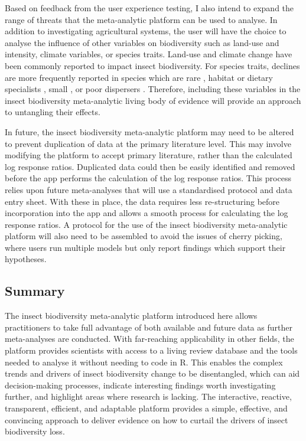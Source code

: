 \documentclass[11pt]{article}
\begin{document}
		\noindent Based on feedback from the user experience testing, I also intend to expand the range of threats that the meta-analytic platform can be used to analyse. In addition to investigating agricultural systems, the user will have the choice to analyse the influence of other variables on biodiversity such as land-use and intensity, climate variables, or species traits. Land-use \citep{newbold2016global,seibold2019arthropod,gillespie2022landscape} and climate change \citep{deutsch2008impacts,lister2018climate,engelhardt2022consistent} have been commonly reported to impact insect biodiversity. For species traits, declines are more frequently reported in species which are rare \citep{powney2019widespread,outhwaite2020complex}, habitat or dietary specialists \citep{biesmeijer2006parallel,boyes2019bucking,wagner2021window}, small \citep{homburg2019have}, or poor dispersers \citep{cardoso2020scientists}. Therefore, including these variables in the insect biodiversity meta-analytic living body of evidence will provide an approach to untangling their effects. 
		
		\noindent In future, the insect biodiversity meta-analytic platform may need to be altered to prevent duplication of data at the primary literature level. This may involve modifying the platform to accept primary literature, rather than the calculated log response ratios. Duplicated data could then be easily identified and removed before the app performs the calculation of the log response ratios. This process relies upon future meta-analyses that will use a standardised protocol and data entry sheet. With these in place, the data requires less re-structuring before incorporation into the app and allows a smooth process for calculating the log response ratios. A protocol for the use of the insect biodiversity meta-analytic platform will also need to be assembled to avoid the issues of cherry picking, where users run multiple models but only report findings which support their hypotheses. 
		
		\subsection{Summary}
		The insect biodiversity meta-analytic platform introduced here allows practitioners to take full advantage of both available and future data as further meta-analyses are conducted. With far-reaching applicability in other fields, the platform provides scientists with access to a living review database and the tools needed to analyse it without needing to code in R. This enables the complex trends and drivers of insect biodiversity change to be disentangled, which can aid decision-making processes, indicate interesting findings worth investigating further, and highlight areas where research is lacking. The interactive, reactive, transparent, efficient, and adaptable platform provides a simple, effective, and convincing approach to deliver evidence on how to curtail the drivers of insect biodiversity loss.  
		
\end{document}

